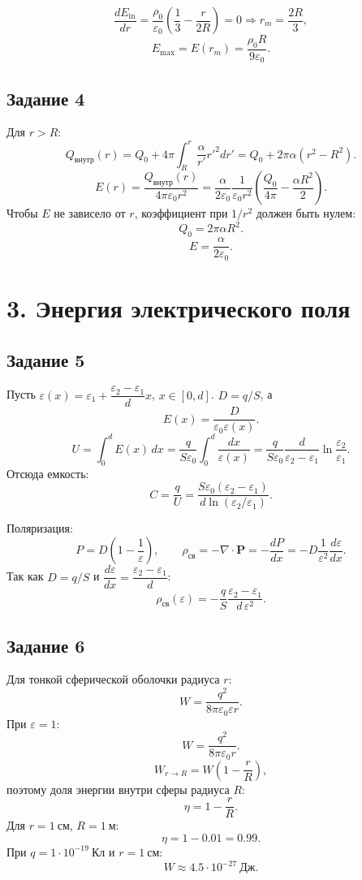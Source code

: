 \documentclass[12pt,a4paper]{article}
\begin{document}
\[
\frac{dE_{\text{in}}}{dr}=\frac{\rho_0}{\varepsilon_0}\left(\frac13-\frac{r}{2R}\right)=0
\Rightarrow r_m=\frac{2R}{3},
\]
\[
E_{\max}=E(r_m)=\frac{\rho_0R}{9\varepsilon_0}.
\]

\subsection*{Задание 4}
Для $r>R$:
\[
Q_{\text{внутр}}(r)=Q_0+4\pi\int_R^r \frac{\alpha}{r'}r'^2dr'
=Q_0+2\pi\alpha(r^2-R^2).
\]
\[
E(r)=\frac{Q_{\text{внутр}}(r)}{4\pi\varepsilon_0r^2}
=\frac{\alpha}{2\varepsilon_0}
\frac{1}{\varepsilon_0r^2}\left(\frac{Q_0}{4\pi}-\frac{\alpha R^2}{2}\right).
\]
Чтобы $E$ не зависело от $r$, коэффициент при $1/r^2$ должен быть нулем:
\[
Q_0=2\pi\alpha R^2.
\]
\[
E=\frac{\alpha}{2\varepsilon_0}.
\]
\newpage
\section*{3. Энергия электрического поля}

\subsection*{Задание 5}
Пусть $\varepsilon(x)=\varepsilon_1+\dfrac{\varepsilon_2-\varepsilon_1}{d}x$, $x\in[0,d]$.
 $D=q/S$, а
\[
E(x)=\frac{D}{\varepsilon_0\varepsilon(x)}.
\]
\[
U=\int_0^d E(x)\,dx=\frac{q}{S\varepsilon_0}\int_0^d\frac{dx}{\varepsilon(x)}
=\frac{q}{S\varepsilon_0}\frac{d}{\varepsilon_2-\varepsilon_1}\ln\frac{\varepsilon_2}{\varepsilon_1}.
\]
Отсюда емкость:
\[
C=\frac{q}{U}=
\frac{S\varepsilon_0(\varepsilon_2-\varepsilon_1)}
{d\ln(\varepsilon_2/\varepsilon_1)}.
\]

Поляризация:
\[
P=D\!\left(1-\frac1\varepsilon\right),
\qquad
\rho_{\text{св}}=-\nabla\!\cdot\!\mathbf P=-\frac{dP}{dx}
=-D\frac{1}{\varepsilon^2}\frac{d\varepsilon}{dx}.
\]
Так как $D=q/S$ и $\dfrac{d\varepsilon}{dx}=\dfrac{\varepsilon_2-\varepsilon_1}{d}$:
\[
\rho_{\text{св}}(\varepsilon)=
-\frac{q}{S}\frac{\varepsilon_2-\varepsilon_1}{d\,\varepsilon^2}.
\]

\subsection*{Задание 6}
Для тонкой сферической оболочки радиуса $r$:
\[
W=\frac{q^2}{8\pi\varepsilon_0\varepsilon r}.
\]
При $\varepsilon=1$:
\[
W=\frac{q^2}{8\pi\varepsilon_0 r}.
\]
\[
W_{r\to R}=W\!\left(1-\frac{r}{R}\right),
\]
поэтому доля энергии внутри сферы радиуса $R$:
\[
\eta=1-\frac{r}{R}.
\]
Для $r=1\ \text{см}$, $R=1\ \text{м}$:
\[
\eta=1-0.01=0.99.
\]
При $q=1\cdot10^{-19}\ \text{Кл}$ и $r=1\ \text{см}$:
\[
W\approx 4.5\cdot10^{-27}\ \text{Дж}.
\]
\end{document}
